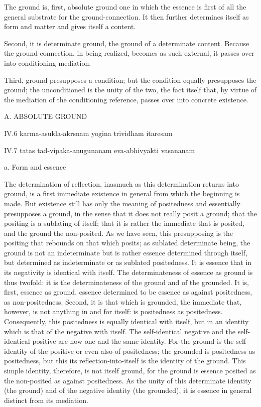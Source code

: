The ground is, first, absolute ground
one in which the essence is first of all
the general substrate for the ground-connection.
It then further determines itself as form and matter
and gives itself a content.

Second, it is determinate ground,
the ground of a determinate content.
Because the ground-connection, in being realized,
becomes as such external,
it passes over into conditioning mediation.

Third, ground presupposes a condition;
but the condition equally presupposes the ground;
the unconditioned is the unity of the two,
the fact itself that, by virtue of
the mediation of the conditioning reference,
passes over into concrete existence.

A. ABSOLUTE GROUND

IV.6
karma-asukla-akrsnam yogina trividham itaresam

IV.7
tatas tad-vipaka-anugunanam eva-abhivyakti vasananam

a. Form and essence

The determination of reflection,
inasmuch as this determination returns into ground,
is a first immediate existence in general
from which the beginning is made.
But existence still has only the meaning of positedness
and essentially presupposes a ground,
in the sense that it does not really posit a ground;
that the positing is a sublating of itself;
that it is rather the immediate that is posited,
and the ground the non-posited.
As we have seen, this presupposing is the positing
that rebounds on that which posits;
as sublated determinate being, the ground is not an indeterminate
but is rather essence determined through itself,
but determined as indeterminate or as sublated positedness.
It is essence that in its negativity is identical with itself.
The determinateness of essence as ground is thus twofold:
it is the determinateness of the ground and of the grounded.
It is, first, essence as ground,
essence determined to be essence
as against positedness, as non-positedness.
Second, it is that which is grounded,
the immediate that, however, is not anything in and for itself:
is positedness as positedness.
Consequently, this positedness is equally identical with itself,
but in an identity which is that of the negative with itself.
The self-identical negative and the self-identical positive
are now one and the same identity.
For the ground is the self-identity
of the positive or even also of positedness;
the grounded is positedness as positedness,
but this its reflection-into-itself is the identity of the ground.
This simple identity, therefore, is not itself ground,
for the ground is essence posited as the non-posited as against positedness.
As the unity of this determinate identity (the ground)
and of the negative identity (the grounded),
it is essence in general distinct from its mediation.

